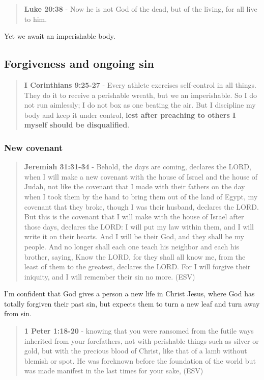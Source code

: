 \documentclass[11pt]{article}
\begin{document}
\begin{quote}
\textbf{Luke 20:38} - Now he is not God of the dead, but of the living, for all live to him.
\end{quote}

Yet we await an imperishable body.

\subsection{Forgiveness and ongoing sin}
\label{sec:orgf64ef3f}
\begin{quote}
\textbf{I Corinthians 9:25-27} - Every athlete exercises self-control in all things. They do it to receive a perishable wreath, but we an imperishable. So I do not run aimlessly; I do not box as one beating the air. But I discipline my body and keep it under control, \textbf{lest after preaching to others I myself should be disqualified}.
\end{quote}

\subsubsection{New covenant}
\label{sec:orgbdbdf2a}
\begin{quote}
\textbf{Jeremiah 31:31-34} - Behold, the days are coming, declares the LORD, when I will make a new covenant with the house of Israel and the house of Judah, not like the covenant that I made with their fathers on the day when I took them by the hand to bring them out of the land of Egypt, my covenant that they broke, though I was their husband, declares the LORD. But this is the covenant that I will make with the house of Israel after those days, declares the LORD: I will put my law within them, and I will write it on their hearts. And I will be their God, and they shall be my people. And no longer shall each one teach his neighbor and each his brother, saying, Know the LORD, for they shall all know me, from the least of them to the greatest, declares the LORD. For I will forgive their iniquity, and I will remember their sin no more. (ESV)
\end{quote}

I'm confident that God gives a person a new life in Christ Jesus, where God has totally forgiven their past sin,
but expects them to turn a new leaf and turn away from sin.

\begin{quote}
\textbf{1 Peter 1:18-20} - knowing that you were ransomed from the futile ways inherited from your forefathers, not with perishable things such as silver or gold, but with the precious blood of Christ, like that of a lamb without blemish or spot. He was foreknown before the foundation of the world but was made manifest in the last times for your sake, (ESV)
\end{quote}
\end{document}
